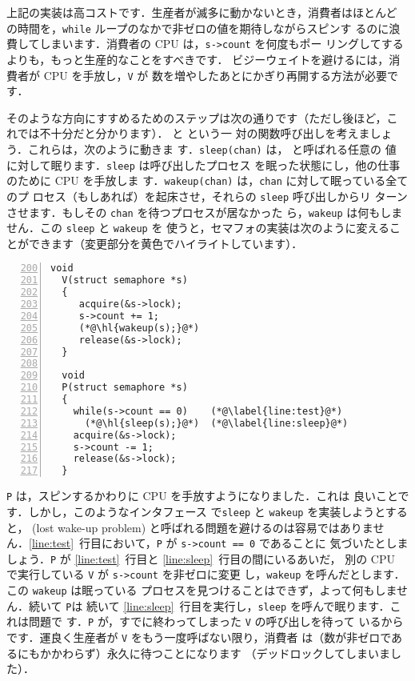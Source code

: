 上記の実装は高コストです．生産者が滅多に動かないとき，消費者はほとんど
の時間を，\lstinline{while} ループのなかで非ゼロの値を期待しながらスピンす
るのに浪費してしまいます．消費者の CPU は，\lstinline{s->count} を何度もポー
リングしてするよりも，もっと生産的なことをすべきです．
ビジーウェイトを避けるには，消費者が CPU を手放し，\lstinline{V} が
数を増やしたあとにかぎり再開する方法が必要です．


そのような方向にすすめるためのステップは次の通りです（ただし後ほど，こ
れでは不十分だと分かります）． と という一
対の関数呼び出しを考えましょう．これらは，次のように動きま
す．\lstinline{sleep(chan)} は， と呼ばれる任意の
値  に対して眠ります．\lstinline{sleep} は呼び出したプロセス
を眠った状態にし，他の仕事のために CPU を手放しま
す．\lstinline{wakeup(chan)} は，\lstinline{chan} に対して眠っている全てのプ
ロセス（もしあれば）を起床させ，それらの \lstinline{sleep} 呼び出しからリ
ターンさせます．もしその \lstinline{chan} を待つプロセスが居なかった
ら，\lstinline{wakeup} は何もしません．この \lstinline{sleep} と \lstinline{wakeup} を
使うと，セマフォの実装は次のように変えることができます（変更部分を黄色でハイライトしています）．
%
\begin{lstlisting}[numbers=left,firstnumber=200]
  void
  V(struct semaphore *s)
  {
     acquire(&s->lock);
     s->count += 1;
     (*@\hl{wakeup(s);}@*)
     release(&s->lock);
  }
  
  void
  P(struct semaphore *s)
  {
    while(s->count == 0)    (*@\label{line:test}@*)
      (*@\hl{sleep(s);}@*)  (*@\label{line:sleep}@*)
    acquire(&s->lock);
    s->count -= 1;
    release(&s->lock);
  }
\end{lstlisting}


\texttt{P} は，スピンするかわりに CPU を手放すようになりました．これは
良いことです．しかし，このようなインタフェース
で\texttt{sleep} と \texttt{wakeup} を実装しようとすると，
 (lost wake-up problem) と呼ばれる問題を避けるのは容易ではありませ
ん．\ref{line:test}~行目において，\texttt{P} が \texttt{s->count == 0} であることに
気づいたとしましょう．\texttt{P} が \ref{line:test}~行目と \ref{line:sleep}~行目の間にいるあいだ，
別の CPU で実行している \texttt{V} が \texttt{s->count} を非ゼロに変更
し，\texttt{wakeup} を呼んだとします．この \texttt{wakeup} は眠っている
プロセスを見つけることはできず，よって何もしません．続いて \texttt{P}は
続いて \ref{line:sleep}~行目を実行し，\texttt{sleep} を呼んで眠ります．これは問題で
す．\texttt{P} が，すでに終わってしまった \texttt{V} の呼び出しを待って
いるからです．運良く生産者が \texttt{V} をもう一度呼ばない限り，消費者
は（数が非ゼロであるにもかかわらず）永久に待つことになります
（デッドロックしてしまいました）．


